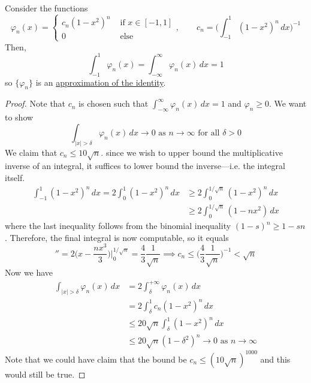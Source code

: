   \begin{theorem}
    \label{thm:functions-else-approximation-identity}
    Consider the functions 
    \begin{equation}
      \varphi_n (x) = \begin{cases} 
        c_n (1 - x^2)^n & \text{ if } x \in [-1, 1] \\ 
        0 & \text{ else }
      \end{cases}, \qquad c_n = \bigg( \int_{-1}^1 (1 - x^2)^n \,dx \bigg)^{-1}
    \end{equation}
    Then, 
    \begin{equation}
      \int_{-1}^1 \varphi_n (x) = \int_{-\infty}^\infty \varphi_n (x) \,dx = 1
    \end{equation}
    so $\{\varphi_n\}$ is an \hyperref[def:approximation-of-the-identity]{approximation of the identity}. 
  \end{theorem}
  \begin{proof}
    Note that $c_n$ is chosen such that $\int_{-\infty}^\infty \varphi_n (x) \,dx = 1$ and $\varphi_n \geq 0$. We want to show 
    \begin{equation}
      \int_{|x| > \delta} \varphi_n (x) \,dx \to 0 \text{ as } n \to \infty \text{ for all } \delta > 0
    \end{equation}
    We claim that $c_n \leq 10 \sqrt{n}$. since we wish to upper bound the multiplicative inverse of an integral, it suffices to lower bound the inverse---i.e. the integral itself. 
    \begin{align}
      \int_{-1}^1 (1 - x^2)^n \,dx = 2 \int_0^1 (1 - x^2)^n \,dx & \geq 2 \int_0^{1/\sqrt{n}} (1 - x^2)^n \,dx \\
                                                                 & \geq 2 \int_0^{1/\sqrt{n}} (1 - nx^2) \,dx 
    \end{align}
    where the last inequality follows from the binomial inequality $(1 - s)^n \geq 1 - sn$. Therefore, the final integral is now computable, so it equals 
    \begin{equation}
      '' = 2 \bigg(x - \frac{nx^3}{3}\bigg) \bigg|_0^{1/\sqrt{n}} = \frac{4}{3} \frac{1}{\sqrt{n}} \implies c_n \leq \bigg( \frac{4}{3} \frac{1}{\sqrt{n}})^{-1} < \sqrt{n}
    \end{equation}  
    Now we have 
    \begin{align}
      \int_{|x| > \delta} \varphi_n (x) \,dx & = 2 \int_\delta^{+\infty} \varphi_n (x) \,dx \\ 
                                             & = 2 \int_\delta^1 c_n (1 - x^2)^n \,dx \\ 
                                             & \leq 20 \sqrt{n} \int_\delta^1 (1 - x^2)^n \,dx \\ 
                                             & \leq 20 \sqrt{n} (1 - \delta^2)^n \to 0 \text{ as } n \to \infty 
    \end{align} 
    Note that we could have claim that the bound be $c_n \leq (10\sqrt{n})^{1000}$ and this would still be true. 
  \end{proof} 

